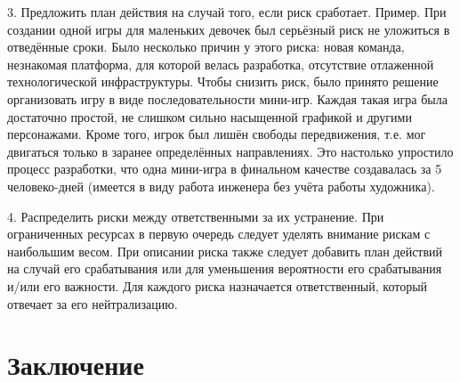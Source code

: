 \documentclass{../industrial-development}
\begin{document}
3. Предложить план действия на случай того, если риск сработает.
Пример. При создании одной игры для маленьких девочек был серьёзный риск не уложиться в отведённые сроки. Было несколько причин у этого риска: новая команда, незнакомая платформа, для которой велась разработка, отсутствие отлаженной технологической инфраструктуры. Чтобы снизить риск, было принято решение организовать игру в виде последовательности мини-игр. Каждая такая игра была достаточно простой, не слишком сильно насыщенной графикой и другими персонажами. Кроме того, игрок был лишён свободы передвижения, т.е. мог двигаться только в заранее определённых направлениях. Это настолько упростило процесс разработки, что одна мини-игра в финальном качестве создавалась за 5 человеко-дней (имеется в виду работа инженера без учёта работы художника).

4. Распределить риски между ответственными за их устранение.
При ограниченных ресурсах в первую очередь следует уделять внимание рискам с наибольшим весом.
При описании риска также следует добавить план действий на случай его срабатывания или для уменьшения вероятности его срабатывания и/или его важности. Для каждого риска назначается ответственный, который отвечает за его нейтрализацию.

\section{Заключение}
\end{document}
